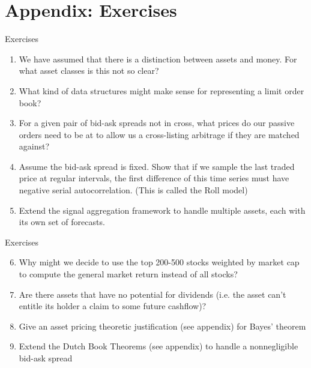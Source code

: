 \documentclass{beamer}
\begin{document}
\section{Appendix: Exercises}
\begin{frame}{Exercises}
	\begin{enumerate}
		\item We have assumed that there is a distinction between assets and money. For what asset classes is this not so clear?
		\item What kind of data structures might make sense for representing a limit order book?
		\item For a given pair of bid-ask spreads not in cross, what prices do our passive orders need to be at to allow us a cross-listing arbitrage if they are matched against?
		\item Assume the bid-ask spread is fixed. Show that if we sample the last traded price at regular intervals, the first difference of this time series must have negative serial autocorrelation. (This is called the Roll model)
		\item Extend the signal aggregation framework to handle multiple assets, each with its own set of forecasts.
	\end{enumerate}
\end{frame}
\begin{frame}{Exercises}
	\begin{enumerate}
		\setcounter{enumi}{5}
		\item Why might we decide to use the top 200-500 stocks weighted by market cap to compute the general market return instead of all stocks?
		\item Are there assets that have no potential for dividends (i.e. the asset can't entitle its holder a claim to some future cashflow)?
		\item Give an asset pricing theoretic justification (see appendix) for Bayes' theorem
		\item Extend the Dutch Book Theorems (see appendix) to handle a nonnegligible bid-ask spread
	\end{enumerate}
\end{frame}
\end{document}
